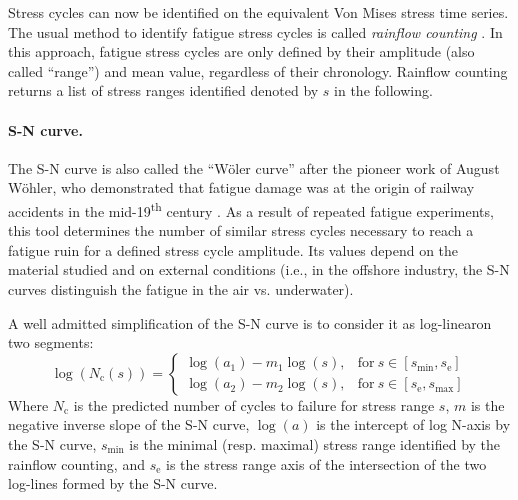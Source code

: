 Stress cycles can now be identified on the equivalent Von Mises stress time series. 
The usual method to identify fatigue stress cycles is called \textit{rainflow counting} \citep{dowling_1972}. 
In this approach, fatigue stress cycles are only defined by their amplitude (also called ``range'') and mean value, regardless of their chronology. 
Rainflow counting returns a list of stress ranges identified denoted by $s$ in the following. 


\paragraph{S-N curve.}
The S-N curve is also called the ``W\"oler curve'' after the pioneer work of August W\"ohler, who demonstrated that fatigue damage was at the origin of railway accidents in the mid-19\textsuperscript{th} century \citep{schutz_1996_history_fatigue}. 
As a result of repeated fatigue experiments, this tool determines the number of similar stress cycles necessary to reach a fatigue ruin for a defined stress cycle amplitude. 
Its values depend on the material studied and on external conditions (i.e., in the offshore industry, the S-N curves distinguish the fatigue in the air vs. underwater). 

A well admitted simplification of the S-N curve is to consider it as log-linear\footnotemark on two segments:
\begin{equation}
\log(N_{\mathrm{c}}(s)) = \left\{
    \begin{array}{ll}
        \log(a_1) - m_1 \log(s), & \mbox{for}~ s \in [s_{\mathrm{min}}, s_{\mathrm{e}}] \\
        \log(a_2) - m_2 \log(s), & \mbox{for}~ s \in [s_{\mathrm{e}}, s_{\mathrm{max}}]
    \end{array}
\right.
\end{equation}
Where $N_{\mathrm{c}}$ is the predicted number of cycles to failure for stress range $s$, $m$ is the negative inverse slope of the S-N curve, 
$\log(a)$ is the intercept of log N-axis by the S-N curve, $s_{\mathrm{min}}$ is the minimal (resp. maximal) stress range identified by the rainflow counting, 
and $s_{\mathrm{e}}$ is the stress range axis of the intersection of the two log-lines formed by the S-N curve. 


